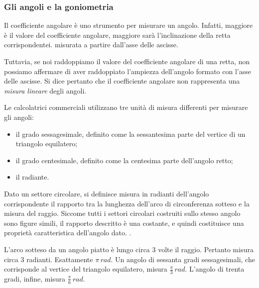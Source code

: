 \subsubsection*{Gli angoli e la goniometria}

Il coefficiente angolare è uno strumento per misurare un angolo.\newline
Infatti, maggiore è il valore del coefficiente angolare, maggiore sarà l'inclinazione della retta corrispondentei. misurata a partire dall'asse delle ascisse.
\newline

Tuttavia, se noi raddoppiamo il valore del coefficiente angolare di una retta, non possiamo affermare di aver raddoppiato l'ampiezza dell'angolo formato con l'asse delle ascisse. Si dice pertanto che il coefficiente angolare non rappresenta una {\slshape misura lineare} degli angoli.\newline

Le calcolatrici commerciali utilizzano tre unità di misura differenti per misurare gli angoli:
\begin{itemize}
\item il grado sessagesimale, definito come la sessantesima parte del vertice di un triangolo equilatero;
\item il grado centesimale, definito come la centesima parte dell'angolo retto;
\item il radiante.
\end{itemize}

Dato un settore circolare, si definisce misura in radianti dell'angolo corrispondente il rapporto tra la lunghezza dell'arco di circonferenza sotteso e la misura del raggio. Siccome tutti i settori circolari costruiti sullo stesso angolo sono figure simili, il rapporto descritto è una costante, e quindi costituisce una proprietà caratteristica dell'angolo dato.
\newline.

L'arco sotteso da un angolo piatto è lungo circa 3 volte il raggio. Pertanto misura circa 3 radianti. Esattamente $\pi\, rad$.\newline
Un angolo di sessanta gradi sessagesimali, che corrisponde al vertice del triangolo equilatero, misura $\frac \pi 3\, rad$.\newline
L'angolo di trenta gradi, infine, misura $\frac \pi 6\, rad$.
\newline

